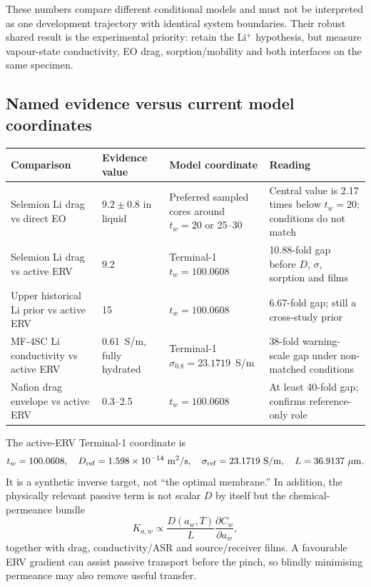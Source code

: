 \documentclass[10pt,a4paper]{article}
\begin{document}
These numbers compare different conditional models and must not be interpreted
as one development trajectory with identical system boundaries. Their robust
shared result is the experimental priority: retain the Li$^+$ hypothesis, but
measure vapour-state conductivity, EO drag, sorption/mobility and both
interfaces on the same specimen.

\subsection{Named evidence versus current model coordinates}

\begin{center}\small
\begin{tabularx}{\textwidth}{@{}p{36mm}p{43mm}p{29mm}Y@{}}
\toprule
\textbf{Comparison} & \textbf{Evidence value} & \textbf{Model coordinate} & \textbf{Reading} \\
\midrule
Selemion Li drag vs direct EO & $9.2\pm0.8$ in liquid & Preferred sampled cores around $t_w=20$ or 25--30 & Central value is 2.17 times below $t_w=20$; conditions do not match \\
Selemion Li drag vs active ERV & 9.2 & Terminal-1 $t_w=100.0608$ & 10.88-fold gap before $D$, $\sigma$, sorption and films \\
Upper historical Li prior vs active ERV & 15 & $t_w=100.0608$ & 6.67-fold gap; still a cross-study prior \\
MF-4SC Li conductivity vs active ERV & 0.61~S/m, fully hydrated & Terminal-1 $\sigma_{0.8}=23.1719$~S/m & 38-fold warning-scale gap under non-matched conditions \\
Nafion drag envelope vs active ERV & 0.3--2.5 & $t_w=100.0608$ & At least 40-fold gap; confirms reference-only role \\
\bottomrule
\end{tabularx}
\end{center}

The active-ERV Terminal-1 coordinate is
\begin{equation}
  t_w=100.0608,\quad D_{\rm ref}=1.598\times10^{-14}\ \mathrm{m^2/s},
  \quad \sigma_{\rm ref}=23.1719\ \mathrm{S/m},\quad L=36.9137\ \mu\mathrm{m}.
\end{equation}
It is a synthetic inverse target, not ``the optimal membrane.'' In addition,
the physically relevant passive term is not scalar $D$ by itself but the
chemical-permeance bundle
\begin{equation}
  K_{a,w}\propto \frac{D(a_w,T)}{L}\frac{\partial C_w}{\partial a_w},
\end{equation}
together with drag, conductivity/ASR and source/receiver films. A favourable
ERV gradient can assist passive transport before the pinch, so blindly
minimising permeance may also remove useful transfer.
\end{document}
